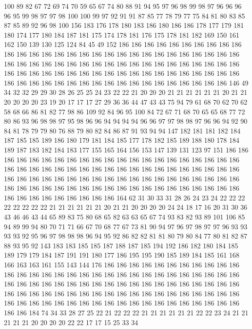 100 89 82 67 72 69 74 70 59 65 67 74 80 88 91 94 95 97 96 98
99 98 97 96 96 96 96 95 99 98 97 97 98 100 100 99 97 92 91 91
87 85 77 78 79 77 75 84 81 80 83 85 87 85 89 92 96 98 100 156
183 176 178 180 183 186 180 186 186 178 177 179 181 180 174 177 180 184 187 181
175 174 178 181 176 175 178 181 182 169 150 161 162 150 139 130 125 124 84 45
49 152 186 186 186 186 186 186 186 186 186 186 186 186 186 186 186 186 186 186
186 186 186 186 186 186 186 186 186 186 186 186 186 186 186 186 186 186 186 186
186 186 186 186 186 186 186 186 186 186 186 186 186 186 186 186 186 186 186 186
186 186 186 186 186 186 186 186 186 186 186 186 186 186 186 186 186 186 186 186
186 186 186 186 186 186 186 146 49 34 32 32 29 29 30 28 26 25 25 24
23 22 22 21 20 20 20 21 21 21 21 21 21 20 21 21 20 20 20 20
23 19 20 17 17 17 27 29 36 36 44 47 43 43 75 94 79 61 68 70
62 70 62 58 68 66 86 81 82 77 98 86 109 92 84 96 95 100 84 72
67 71 68 70 65 65 68 77 72 80 86 93 96 98 98 97 95 98 96 96
94 94 94 94 96 96 97 97 98 98 97 96 96 94 92 90 84 81 78 79
79 80 76 88 79 80 82 84 86 87 91 93 94 94 147 182 181 181 182 184
187 185 185 189 186 180 179 181 184 185 177 178 182 185 189 188 180 178 184 189
187 183 182 184 183 177 155 165 164 156 153 147 139 131 123 97 151 186 186 186
186 186 186 186 186 186 186 186 186 186 186 186 186 186 186 186 186 186 186 186
186 186 186 186 186 186 186 186 186 186 186 186 186 186 186 186 186 186 186 186
186 186 186 186 186 186 186 186 186 186 186 186 186 186 186 186 186 186 186 186
186 186 186 186 186 186 186 186 186 186 186 186 186 186 186 186 186 186 186 186
186 186 186 186 164 62 31 30 33 31 28 26 24 23 24 22 22 22 22 22
22 22 22 21 21 21 21 21 21 20 21 21 20 20 20 20 24 24 18 17
16 20 31 30 36 43 46 46 43 44 65 89 83 75 80 68 65 82 63 63
65 67 74 93 83 82 93 89 101 106 85 94 89 99 94 80 70 71 71 66
67 70 68 77 67 73 81 90 94 97 96 97 98 97 97 96 93 93 93 93
92 95 96 97 98 98 98 96 94 95 92 86 82 82 81 81 80 79 80 84
77 80 81 82 87 88 93 95 92 143 183 183 185 185 187 188 187 185 194 192
186 182 180 184 185 189 179 179 184 187 191 191 180 177 186 195 195 190 185 189
184 185 161 168 166 163 163 161 155 143 144 176 186 186 186 186 186 186 186 186
186 186 186 186 186 186 186 186 186 186 186 186 186 186 186 186 186 186 186 186
186 186 186 186 186 186 186 186 186 186 186 186 186 186 186 186 186 186 186 186
186 186 186 186 186 186 186 186 186 186 186 186 186 186 186 186 186 186 186 186
186 186 186 186 186 186 186 186 186 186 186 186 186 186 186 186 186 186 186 186
186 184 74 34 33 28 27 25 22 21 22 22 22 21 21 21 21 21 21 22
22 23 24 21 21 21 21 21 20 20 20 20 22 22 17 17 15 25 33 34
